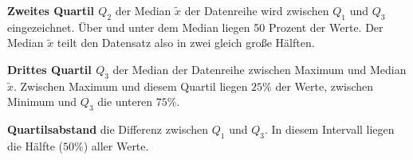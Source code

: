 \textbf{Zweites Quartil $Q_{2}$}  der Median $\tilde{x}$ der Datenreihe wird zwischen $Q_{1}$ und $Q_{3}$ eingezeichnet. \"{U}ber und unter dem Median liegen 50 Prozent der Werte. Der Median $\tilde{x}$ teilt den Datensatz also in zwei gleich gro\ss{}e H\"{a}lften.

\textbf{Drittes Quartil $Q_{3}$}  der Median der Datenreihe zwischen Maximum und Median $\tilde{x}$. Zwischen Maximum und diesem Quartil liegen $25\%$ der Werte, zwischen Minimum und $Q_{3}$ die unteren $75\%$.

\textbf{Quartilsabstand}  die Differenz zwischen $Q_{1}$ und $Q_{3}$. In diesem Intervall liegen die H\"{a}lfte ($50 \%$) aller Werte.



